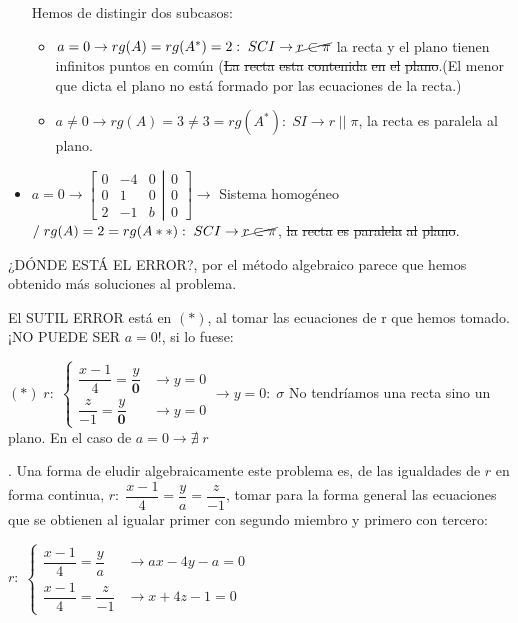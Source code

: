 \begin{proofw}
\begin{itemize}
Hemos de distingir dos subcasos:

	\begin{itemize}
	\item $a=0\to rg(A)=rg(A^*)=2:\; SCI \to \cancel{r\subset \pi}$ la recta y el plano tienen infinitos puntos en común (\st{La} \st{recta} \st{esta} \st{contenida} \st{en} \st{el} \st{plano}.\textcolor{gris}{(El menor que dicta el plano no está formado por las ecuaciones de la recta.)}
	\item $a\neq 0 \to rg(A)=3\neq 3=rg(A^*):\; SI \to r\;||\; \pi$, la recta es paralela al plano.
	\end{itemize}
\item $a=0 \to \left[ \begin{matrix} 0&-4&0\\0&1&0\\2&-1&b\end{matrix}\right.\left|\begin{matrix}0\\0\\0\end{matrix}\right]\to $ Sistema homogéneo $/\; rg(A)=2=rg(A**):\; SCI \to \cancel{r \subset \pi}$, \st{la} \st{recta} \st{es} \st{paralela} \st{al} \st{plano}.
\end{itemize}
\noindent ¿DÓNDE ESTÁ EL ERROR?, por el método algebraico parece que hemos obtenido más soluciones al problema.

\noindent El SUTIL ERROR está en $(*)$, al tomar las ecuaciones de r que hemos tomado. ¡NO PUEDE SER $a=0$!, si lo fuese:

\noindent  $(*)\;r:\;\begin{cases} \dfrac {x-1}4=\dfrac y {\boldsymbol{0}} &\to y=0
\\ \dfrac z{-1}=\dfrac y {\boldsymbol{0}} &\to 	y=0
\end{cases} \to y=0:\; \sigma$ No tendríamos una recta sino un plano. En el caso de $a=0 \to \nexists \; r$

\noindent. Una forma de eludir algebraicamente este problema es, de las igualdades de $r$ en forma continua, $r:\;\dfrac{x-1}{4}=\dfrac{y}{a}=\dfrac{z}{-1}$, tomar para la forma general las ecuaciones que se obtienen al igualar primer con segundo miembro y primero con tercero:

\noindent $r:\;\begin{cases} \dfrac {x-1}4=\dfrac y a &\to ax-4y-a=0
\\ \dfrac {x-1}4=\dfrac z{-1} &\to 	x+4z-1=0
\end{cases} $


\end{proofw}
